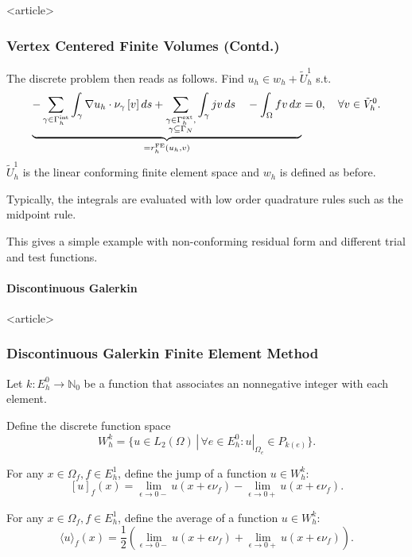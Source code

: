 \begin{frame}<article>
\frametitle<presentation>{Vertex Centered Finite Volumes (Contd.)}
The discrete problem then reads as follows. Find $u_h\in w_h+\tilde{U}_h^1$ s.t.
\begin{equation}
\underbrace{- \sum_{\gamma\in\Gamma_h^{\text{int}}} \int_\gamma
\nabla u_h \cdot \nu_\gamma \,[v]\,d s
+ \sum_{\substack{\gamma\in\Gamma_h^{\text{ext}},\\ \gamma\subseteq\Gamma_N}}
\int_\gamma j v \,d s\quad
- \int_\Omega fv \,d x}_{= r_h^\text{FE}(u_h,v)} = 0,
\quad \forall v\in \tilde{V}_h^0.
\end{equation}
$\tilde{U}_h^1$ is the linear conforming finite element space and $w_h$ is
defined as before.

Typically, the integrals are evaluated with low order quadrature rules
such as the midpoint rule.

This gives a simple example with non-conforming residual form and
different trial and test functions.
\end{frame}


\paragraph{Discontinuous Galerkin}

\begin{frame}<article>
\frametitle<presentation>{Discontinuous Galerkin Finite Element
Method}
Let $k : E^0_h \to \mathbb{N}_0$ be a function that associates an
nonnegative integer with each element.

Define the discrete function space
\begin{equation*}
W_h^k = \{u\in L_2(\Omega) \,|\, \forall e\in E^0_h : u|_{\Omega_e} \in P_{k(e)}\}.
\end{equation*}

For any $x\in\Omega_f, f\in E_h^1$, define the jump of a function
$u\in W_h^k$:
\begin{equation*}
\label{Eq:Jump}
[u]_f(x) = \lim\limits_{\epsilon\to 0-} u(x+\epsilon\nu_f) -
\lim\limits_{\epsilon\to 0+} u(x+\epsilon\nu_f).
\end{equation*}

For any $x\in\Omega_f, f\in E_h^1$, define the average of a function
$u\in W_h^k$:
\begin{equation*}
\label{Eq:Average}
\langle u\rangle_f(x) = \frac{1}{2}\left(\lim\limits_{\epsilon\to 0-} u(x+\epsilon
\nu_f) +  \lim\limits_{\epsilon\to 0+} u(x+\epsilon
\nu_f)\right ).
\end{equation*}

\end{frame}


